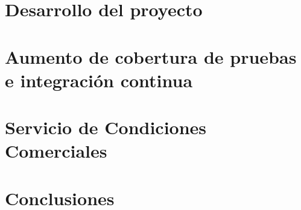 \documentclass[pdftex,spanish]{pucthesis}	%
\begin{document}
\chapter{Desarrollo del proyecto} \label{metodologias}


\chapter{Aumento de cobertura de pruebas e integración continua} \label{testing}


\chapter{Servicio de Condiciones Comerciales} \label{servicio_cc}


\chapter{Conclusiones} \label{conclusiones}



\cleardoublepage
{} \label{references}

\renewcommand{\bibname}{Referencias}







% 

% 
\end{document}
